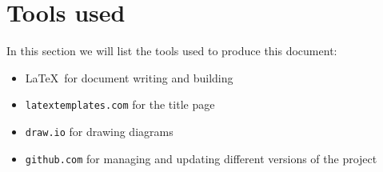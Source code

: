 \documentclass[../DD0.tex]{subfiles}
\begin{document}
\section*{Tools used}
\label{sec:tools}

  In this section we will list the tools used to produce this document:
  \begin{itemize}[noitemsep]
    \item \LaTeX\ for document writing and building

    \item \texttt{latextemplates.com} for the title page

    \item \texttt{draw.io} for drawing diagrams

    \item \texttt{github.com} for managing and updating different versions of the project

  \end{itemize}
\end{document}

